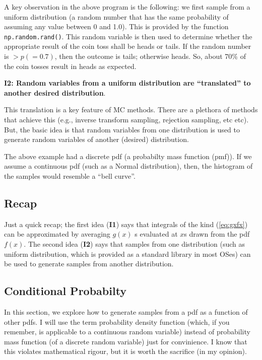 \documentclass[11pt,onecolumn]{article}
\begin{document}
A key observation in the above program is the following: we first sample from a uniform distribution (a random number that has the same probability of assuming any value between 0 and 1.0). This is provided by the function {\texttt{np.random.rand()}}. This random variable is then used to determine whether the appropriate result of the coin toss shall be heads or tails. If the random number is $> p (= 0.7)$, then the outcome is tails; otherwise heads. So, about 70\% of the coin tosses result in heads as expected.

{\bf I2: Random variables from a uniform distribution are ``translated'' to another desired distribution}. 

This translation is a key feature of MC methods. There are a plethora of methods that achieve this (e.g., inverse transform sampling, rejection sampling, etc etc). But, the basic idea is that random variables from one distribution is used to generate random variables of another (desired) distribution.

The above example had a discrete pdf (a probabilty mass function (pmf)). If we assume a continuous pdf (such as a Normal distribution), then, the histogram of the samples would resemble a ``bell curve''.

\subsection{Recap}
Just a quick recap; the first idea ({\bf I1}) says that integrals of the kind (\ref{eq:gxfx}) can be approximated by averaging $g(x)$ s evaluated at $x$s drawn from the pdf $f(x)$. The second idea ({\bf I2}) says that samples from one distribution (such as uniform distribution, which is provided as a standard library in most OSes) can be used to generate samples from another distribution.

\subsection{Conditional Probabilty}
In this section, we explore how to generate samples from a pdf as a function of other pdfs. I will use the term probability density function (which, if you remember, is applicable to a continuous random variable) instead of probability mass function (of a discrete random variable) just for convinience. I know that this violates mathematical rigour, but it is worth the sacrifice (in my opinion).
\end{document}
